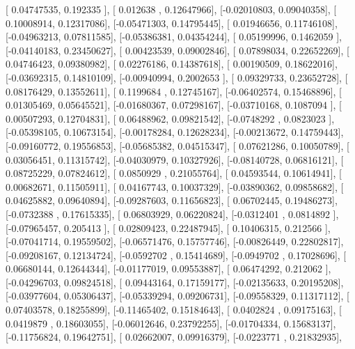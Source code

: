 \documentclass{article}
\begin{document}
       [ 0.04747535,  0.192335  ],
       [ 0.012638  ,  0.12647966],
       [-0.02010803,  0.09040358],
       [ 0.10008914,  0.12317086],
       [-0.05471303,  0.14795445],
       [ 0.01946656,  0.11746108],
       [-0.04963213,  0.07811585],
       [-0.05386381,  0.04354244],
       [ 0.05199996,  0.1462059 ],
       [-0.04140183,  0.23450627],
       [ 0.00423539,  0.09002846],
       [ 0.07898034,  0.22652269],
       [ 0.04746423,  0.09380982],
       [ 0.02276186,  0.14387618],
       [ 0.00190509,  0.18622016],
       [-0.03692315,  0.14810109],
       [-0.00940994,  0.2002653 ],
       [ 0.09329733,  0.23652728],
       [ 0.08176429,  0.13552611],
       [ 0.1199684 ,  0.12745167],
       [-0.06402574,  0.15468896],
       [ 0.01305469,  0.05645521],
       [-0.01680367,  0.07298167],
       [-0.03710168,  0.1087094 ],
       [ 0.00507293,  0.12704831],
       [ 0.06488962,  0.09821542],
       [-0.0748292 ,  0.0823023 ],
       [-0.05398105,  0.10673154],
       [-0.00178284,  0.12628234],
       [-0.00213672,  0.14759443],
       [-0.09160772,  0.19556853],
       [-0.05685382,  0.04515347],
       [ 0.07621286,  0.10050789],
       [ 0.03056451,  0.11315742],
       [-0.04030979,  0.10327926],
       [-0.08140728,  0.06816121],
       [ 0.08725229,  0.07824612],
       [ 0.0850929 ,  0.21055764],
       [ 0.04593544,  0.10614941],
       [ 0.00682671,  0.11505911],
       [ 0.04167743,  0.10037329],
       [-0.03890362,  0.09858682],
       [ 0.04625882,  0.09640894],
       [-0.09287603,  0.11656823],
       [ 0.06702445,  0.19486273],
       [-0.0732388 ,  0.17615335],
       [ 0.06803929,  0.06220824],
       [-0.0312401 ,  0.0814892 ],
       [-0.07965457,  0.205413  ],
       [ 0.02809423,  0.22487945],
       [ 0.10406315,  0.212566  ],
       [-0.07041714,  0.19559502],
       [-0.06571476,  0.15757746],
       [-0.00826449,  0.22802817],
       [-0.09208167,  0.12134724],
       [-0.0592702 ,  0.15414689],
       [-0.0949702 ,  0.17028696],
       [ 0.06680144,  0.12644344],
       [-0.01177019,  0.09553887],
       [ 0.06474292,  0.212062  ],
       [-0.04296703,  0.09824518],
       [ 0.09443164,  0.17159177],
       [-0.02135633,  0.20195208],
       [-0.03977604,  0.05306437],
       [-0.05339294,  0.09206731],
       [-0.09558329,  0.11317112],
       [ 0.07403578,  0.18255899],
       [-0.11465402,  0.15184643],
       [ 0.0402824 ,  0.09175163],
       [ 0.0419879 ,  0.18603055],
       [-0.06012646,  0.23792255],
       [-0.01704334,  0.15683137],
       [-0.11756824,  0.19642751],
       [ 0.02662007,  0.09916379],
       [-0.0223771 ,  0.21832935],
\end{document}
